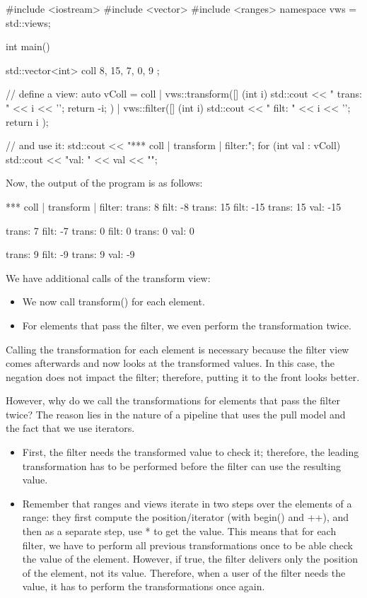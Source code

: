 \begin{cpp}
#include <iostream>
#include <vector>
#include <ranges>
namespace vws = std::views;

int main()
{
	std::vector<int> coll{ 8, 15, 7, 0, 9 };
	
	// define a view:
	auto vColl = coll
	| vws::transform([] (int i) {
		std::cout << " trans: " << i << '\n';
		return -i;
	})
	| vws::filter([] (int i) {
		std::cout << " filt: " << i << '\n';
		return i %
	});
	
	// and use it:
	std::cout << "*** coll | transform | filter:\n";
	for (int val : vColl) {
	std::cout << "val: " << val << "\n\n";
	}
}
\end{cpp}

Now, the output of the program is as follows:

{\footnotesize
\begin{shell}
*** coll | transform | filter:
trans: 8
filt: -8
trans: 15
filt: -15
trans: 15
val: -15

trans: 7
filt: -7
trans: 0
filt: 0
trans: 0
val: 0

trans: 9
filt: -9
trans: 9
val: -9
\end{shell}
}

We have additional calls of the transform view:

\begin{itemize}
\item
We now call transform() for each element.

\item
For elements that pass the filter, we even perform the transformation twice.
\end{itemize}

Calling the transformation for each element is necessary because the filter view comes afterwards and now looks at the transformed values. In this case, the negation does not impact the filter; therefore, putting it to the front looks better.

However, why do we call the transformations for elements that pass the filter twice? The reason lies in the nature of a pipeline that uses the pull model and the fact that we use iterators.

\begin{itemize}
\item
First, the filter needs the transformed value to check it; therefore, the leading transformation has to be performed before the filter can use the resulting value.
	
\item
Remember that ranges and views iterate in two steps over the elements of a range: they first compute the position/iterator (with begin() and ++), and then as a separate step, use * to get the value. This means that for each filter, we have to perform all previous transformations once to be able check the value of the element. However, if true, the filter delivers only the position of the element, not its value. Therefore, when a user of the filter needs the value, it has to perform the transformations once again.
\end{itemize}

